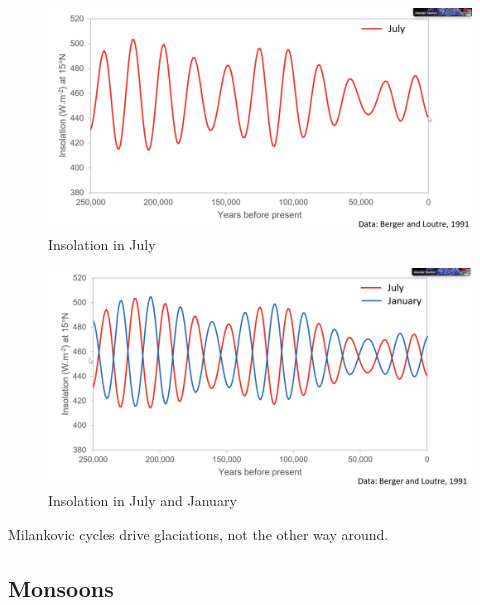 \begin{figure}[H]
    \centering
    \includegraphics[width=1.0\linewidth]{content/img/insolation_in_july.png}
    \caption{Insolation in July}
\end{figure}

\begin{figure}[H]
    \centering
    \includegraphics[width=1\linewidth]{content/img/insolation_july_january.png}
    \caption{Insolation in July and January}
\end{figure}

Milankovic cycles drive glaciations, not the other way around.

\subsection{Monsoons}

